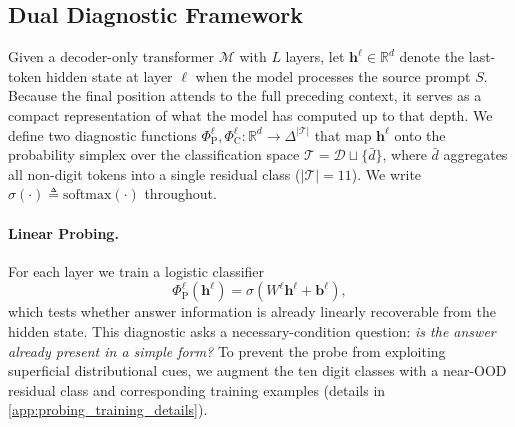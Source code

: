 
\subsection{Dual Diagnostic Framework}
\label{subsec:dual_diagnostic}

Given a decoder-only transformer $\mathcal{M}$ with $L$ layers, let $\mathbf{h}^\ell \in \mathbb{R}^d$ denote the last-token hidden state at layer $\ell$ when the model processes the source prompt $S$. Because the final position attends to the full preceding context, it serves as a compact representation of what the model has computed up to that depth. We define two diagnostic functions $\Phi_{\mathrm{P}}^\ell, \Phi_{\mathrm{C}}^\ell: \mathbb{R}^d \to \Delta^{|\mathcal{T}|}$ that map $\mathbf{h}^\ell$ onto the probability simplex over the classification space $\mathcal{T} = \mathcal{D} \sqcup \{\bar{d}\}$, where $\bar{d}$ aggregates all non-digit tokens into a single residual class ($|\mathcal{T}| = 11$). We write $\sigma(\cdot) \triangleq \mathrm{softmax}(\cdot)$ throughout.


\paragraph{Linear Probing.}
For each layer we train a logistic classifier \citep{belinkov2022probing}
%
\begin{equation}
\label{eq:probing}
\Phi_{\mathrm{P}}^\ell(\mathbf{h}^\ell) = \sigma(W^\ell \mathbf{h}^\ell + \mathbf{b}^\ell),
\end{equation}
%
which tests whether answer information is already linearly recoverable from the hidden state. This diagnostic asks a necessary-condition question: \emph{is the answer already present in a simple form?} To prevent the probe from exploiting superficial distributional cues, we augment the ten digit classes with a near-OOD residual class and corresponding training examples \citep{hewitt2019designing} (details in \cref{app:probing_training_details}).

